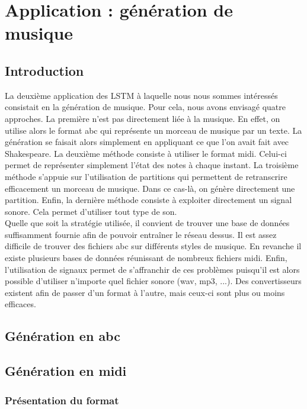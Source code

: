 \chapter{Application : génération de musique}

\section{Introduction}

La deuxième application des LSTM à laquelle nous nous sommes intéressés consistait en la génération de musique. Pour cela, nous avons envisagé quatre approches. La première n'est pas directement liée à la musique. En effet, on utilise alors le format abc qui représente un morceau de musique par un texte. La génération se faisait alors simplement en appliquant ce que l'on avait fait avec Shakespeare. La deuxième méthode consiste à utiliser le format midi. Celui-ci permet de représenter simplement l'état des notes à chaque instant. La troisième méthode s'appuie sur l'utilisation de partitions qui permettent de retranscrire efficacement un morceau de musique. Dans ce cas-là, on génère directement une partition. Enfin, la dernière méthode consiste à exploiter directement un signal sonore. Cela permet d'utiliser tout type de son. \\
Quelle que soit la stratégie utilisée, il convient de trouver une base de données suffisamment fournie afin de pouvoir entraîner le réseau dessus. Il est assez difficile de trouver des fichiers abc sur différents styles de musique. En revanche il existe plusieurs bases de données réunissant de nombreux fichiers midi. Enfin, l'utilisation de signaux permet de s'affranchir de ces problèmes puisqu'il est alors possible d'utiliser n'importe quel fichier sonore (wav, mp3, ...). Des convertisseurs existent afin de passer d'un format à l'autre, mais ceux-ci sont plus ou moins efficaces.
\section{Génération en abc}

\section{Génération en midi}

\subsection{Présentation du format}


